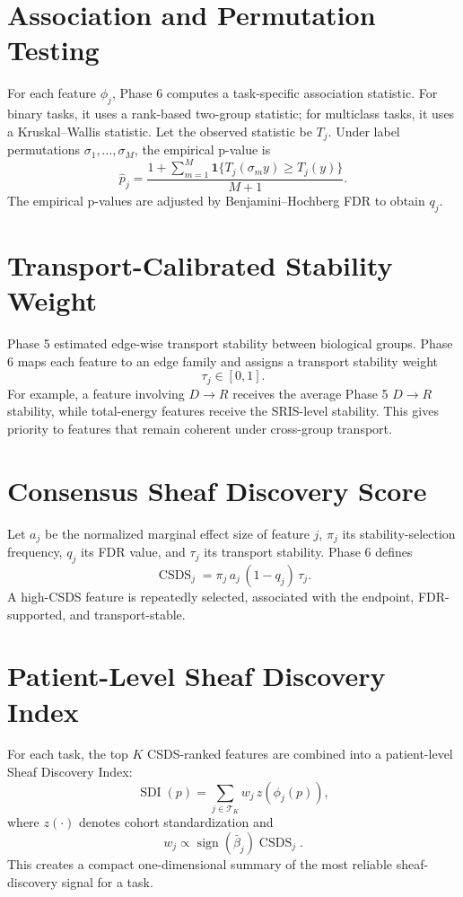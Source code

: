 \documentclass[11pt]{article}
\begin{document}
\section{Association and Permutation Testing}
For each feature $\phi_j$, Phase 6 computes a task-specific association statistic. For binary tasks, it uses a rank-based two-group statistic; for multiclass tasks, it uses a Kruskal--Wallis statistic. Let the observed statistic be $T_j$. Under label permutations $\sigma_1,\ldots,\sigma_M$, the empirical p-value is
\[
\widehat{p}_j
=\frac{1+\sum_{m=1}^{M}\mathbf{1}\{T_j(\sigma_m y)\ge T_j(y)\}}{M+1}.
\]
The empirical p-values are adjusted by Benjamini--Hochberg FDR to obtain $q_j$.

\section{Transport-Calibrated Stability Weight}
Phase 5 estimated edge-wise transport stability between biological groups. Phase 6 maps each feature to an edge family and assigns a transport stability weight
\[
\tau_j\in[0,1].
\]
For example, a feature involving $D\to R$ receives the average Phase 5 $D\to R$ stability, while total-energy features receive the SRIS-level stability. This gives priority to features that remain coherent under cross-group transport.

\section{Consensus Sheaf Discovery Score}
Let $a_j$ be the normalized marginal effect size of feature $j$, $\pi_j$ its stability-selection frequency, $q_j$ its FDR value, and $\tau_j$ its transport stability. Phase 6 defines
\[
\boxed{
\operatorname{CSDS}_j
=\pi_j\,a_j\,(1-q_j)\,\tau_j.
}
\]
A high-CSDS feature is repeatedly selected, associated with the endpoint, FDR-supported, and transport-stable.

\section{Patient-Level Sheaf Discovery Index}
For each task, the top $K$ CSDS-ranked features are combined into a patient-level Sheaf Discovery Index:
\[
\operatorname{SDI}(p)=
\sum_{j\in\mathcal{T}_K} w_j\,z(\phi_j(p)),
\]
where $z(\cdot)$ denotes cohort standardization and
\[
w_j\propto \operatorname{sign}(\bar{\beta}_j)\operatorname{CSDS}_j.
\]
This creates a compact one-dimensional summary of the most reliable sheaf-discovery signal for a task.
\end{document}
